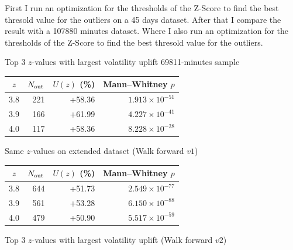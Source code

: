 \documentclass[12pt]{article}
\begin{document}
First I run an optimization for the thresholds of the Z-Score to find the best thresold value for the outliers on a 45 days dataset.
After that I compare the result with a 107880 minutes dataset. Where I also run an optimization for the thresholds of the Z-Score to find the best thresold value for the outliers.


Top 3 $z$-values with largest volatility uplift 69811-minutes sample

\begin{table}[H]
  \centering
  
  \label{tap:top3-z}
  \begin{tabular}{@{} c  r  r  r @{}}  
    \toprule
    $z$ & $N_{\rm out}$ & $U(z)$ (\%) & Mann–Whitney $p$ \\  
  \midrule
  3.8 & 221 &  +58.36 & $1.913\times10^{-51}$ \\  
  3.9 & 166 & +61.99 & $4.227\times10^{-41}$ \\  
  4.0 & 117 & +58.36 & $8.228\times10^{-28}$ \\ 
\bottomrule
\end{tabular}

\end{table}

Same $z$-values on extended dataset (Walk forward $v1$)

\begin{table}[H]
  \centering
  
  \label{tap:old-z-values-out-of-sample}
  \begin{tabular}{@{} c  r  r  r @{}}  
    \toprule
    $z$ & $N_{\rm out}$ & $U(z)$ (\%) & Mann–Whitney $p$ \\  
  \midrule
  3.8 & 644 & +51.73 & $2.549\times10^{-77}$ \\  
  3.9 & 561 & +53.28 & $6.150\times10^{-88}$ \\  
  4.0 & 479 & +50.90 & $5.517\times10^{-59}$ \\ 
\bottomrule
\end{tabular}

\end{table}





Top 3 $z$-values with largest volatility uplift (Walk forward $v2$)
\end{document}

